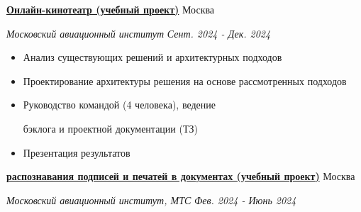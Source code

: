 \documentclass[14pt, a4paper, oneside]{extarticle}
\begin{document}

\begin{flushleft}
	\vspace{-\intextsep}
	\quad
	\href{https://github.com/Crazy5202/Python_project}{\textbf{Онлайн-кинотеатр (учебный проект)}}
	\hfill
	Москва
\end{flushleft}

\begin{flushleft}
	\vspace{-1\intextsep}
	\quad
	\textit{Московский авиационный институт}
	\hfill
	\textit{\small Сент. 2024 - Дек. 2024}
\end{flushleft}


\begin{itemize}
	\vspace{-2\intextsep}
	\item Анализ существующих решений и архитектурных подходов
	\vspace{-0.8\intextsep}
	\item Проектирование архитектуры решения на основе рассмотренных подходов
	\vspace{-0.8\intextsep}
    \item Руководство командой (4 человека), ведение 

    \vspace{-0.5\intextsep}
    бэклога и проектной документации (ТЗ)
    \vspace{-0.8\intextsep}
    \item Презентация результатов
\end{itemize}


\begin{flushleft}
	\vspace{-0.8\intextsep}
	\quad
	\href{https://github.com/Crazy5202/CM_2024}{\textbf{ распознавания подписей и печатей в документах (учебный проект)}}
	\hfill
	Москва
\end{flushleft}

\begin{flushleft}
	\vspace{-1\intextsep}
	\quad
	\textit{Московский авиационный институт, МТС}
	\hfill
	\textit{\small Фев. 2024 - Июнь 2024}
\end{flushleft}

\end{document}
